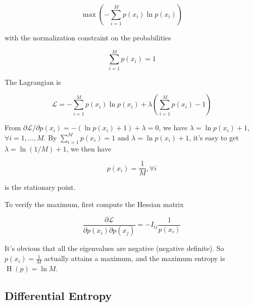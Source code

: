 \documentclass{article}
\begin{document}
                \begin{equation*}
                     \max \left( - \sum_{i=1}^M p(x_i) \ln p(x_i) \right)
                \end{equation*}

                with the normalization constraint on the probabilities

                \begin{equation*}
                     \sum_{i=1}^M p(x_i) = 1
                \end{equation*}

                The Lagrangian is

                \begin{equation*}
                     \mathcal{L} = -\sum_{i=1}^M p(x_i)\ln p(x_i) +
                     \lambda \left(
                        \sum_{i=1}^M p(x_i) - 1
                     \right)
                \end{equation*}

                From $ \partial \mathcal{L} / \partial p(x_i) = - ( \ln p(x_i) + 1) +
                \lambda = 0 $, we have $ \lambda = \ln p(x_i) + 1 $,
                $ \forall i = 1, \dots, M $. By $ \sum_{i=1}^M p(x_{i}) = 1 $ and $
                \lambda = \ln p(x_i) + 1 $, it's easy to get $ \lambda = \ln(1 / M)
                + 1 $, we then have 

                \begin{equation*}
                     p(x_i) = \frac{1}{M},\forall i
                \end{equation*}

                is the stationary point.

                To verify the maximum, first compute the Hessian matrix

                \begin{equation*}
                     \frac{\partial \mathcal{L}}{\partial p(x_{i}) \partial
                     p(x_{j})} = - I_{ij} \frac{1}{p(x_i)}
                \end{equation*}

                It's obvious that all the eigenvalues are negative (negative
                definite). So $ p(x_{i}) = \frac{1}{M} $ actually attains a
                maximum, and the maximum entropy is $ \operatorname{H}(p) = \ln M $.

            

            
        \subsection{Differential Entropy}
\end{document}
